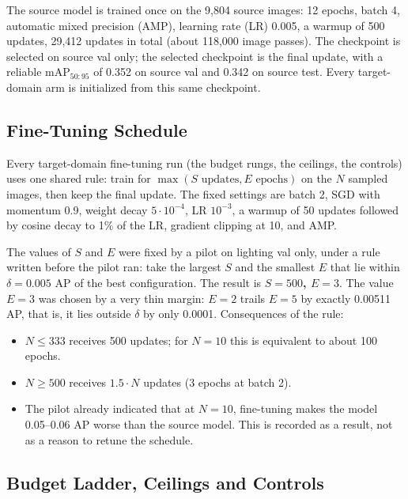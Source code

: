 The source model is trained once on the 9,804 source images: 12 epochs, batch 4, automatic mixed precision (AMP), learning rate (LR) 0.005, a warmup of 500 updates, 29,412 updates in total (about 118,000 image passes). The checkpoint is selected on source val only; the selected checkpoint is the final update, with a reliable mAP$_{50:95}$ of 0.352 on source val and 0.342 on source test. Every target-domain arm is initialized from this same checkpoint.

\subsection{Fine-Tuning Schedule}\label{sec:schedule}

Every target-domain fine-tuning run (the budget rungs, the ceilings, the controls) uses one shared rule: train for $\max(S \text{ updates}, E \text{ epochs})$ on the $N$ sampled images, then keep the final update. The fixed settings are batch 2, SGD with momentum 0.9, weight decay $5\cdot10^{-4}$, LR $10^{-3}$, a warmup of 50 updates followed by cosine decay to 1\% of the LR, gradient clipping at 10, and AMP.

The values of $S$ and $E$ were fixed by a pilot on lighting val only, under a rule written before the pilot ran: take the largest $S$ and the smallest $E$ that lie within $\delta = 0.005$ AP of the best configuration. The result is \textbf{\boldmath $S = 500$, $E = 3$}. The value $E = 3$ was chosen by a very thin margin: $E = 2$ trails $E = 5$ by exactly 0.00511 AP, that is, it lies outside $\delta$ by only 0.0001. Consequences of the rule:
\begin{itemize}
\item $N \leq 333$ receives 500 updates; for $N = 10$ this is equivalent to about 100 epochs.
\item $N \geq 500$ receives $1.5\cdot N$ updates (3 epochs at batch 2).
\item The pilot already indicated that at $N = 10$, fine-tuning makes the model 0.05--0.06 AP worse than the source model. This is recorded as a result, not as a reason to retune the schedule.
\end{itemize}

\subsection{Budget Ladder, Ceilings and Controls}\label{sec:ladder}

